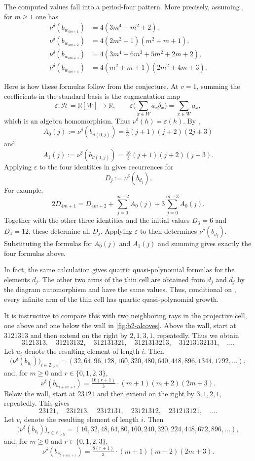 \documentclass[a4paper,11pt]{amsart}
\renewcommand{\dots}{\text{...}}
\newcommand{\R}{\mathbb{R}}
\newcommand{\Z}{\mathbb{Z}}
\newcommand{\Hecke}{\mc H}
\newcommand{\mc}{\mathcal}
\numberwithin{equation}{subsection}
\theoremstyle{definition}
\theoremstyle{remark}
\begin{document}
The computed values fall into a period-four pattern. More precisely,
assuming \cite[Conjecture~6.1]{BaBiPl-KL-B2}, for \(m\geq1\) one has
\[
\begin{aligned}
\nu^\delta(b_{w_{4m+1}})
&=
4(3m^4+m^2+2),
\\
\nu^\delta(b_{w_{4m+2}})
&=
4(2m^2+1)(m^2+m+1),\\
\nu^\delta(b_{w_{4m+3}})
&=
4(3m^4+6m^3+5m^2+2m+2),\\
\nu^\delta(b_{w_{4m+4}})
&=
4(m^2+m+1)(2m^2+4m+3).
\end{aligned}
\]

Here is how these formulas follow from the conjecture. At \(v=1\), summing
the coefficients in the standard basis is the augmentation map
\[
\varepsilon\colon\Hecke=\R[W]\longrightarrow\R,
\qquad
\varepsilon\big(\sum_{x\in W}a_x\delta_x\big)=\sum_{x\in W}a_x,
\]
which is an algebra homomorphism. Thus
\(\nu^\delta(h)=\varepsilon(h)\). By
\cite[Theorem~1.1 and Corollary~2.5]{BaBiPl-KL-B2},
\[
A_0(j):=\nu^\delta(b_{\vartheta(0,j)})
=
\tfrac{4}{3}(j+1)(j+2)(2j+3)
\]
and
\[
A_1(j):=\nu^\delta(b_{\vartheta(1,j)})
=
\tfrac{16}{3}(j+1)(j+2)(j+3).
\]
Applying \(\varepsilon\) to the four identities in
\cite[Conjecture~6.1(2)]{BaBiPl-KL-B2} gives recurrences for
\[
D_j:=\nu^\delta(b_{d_j}).
\]
For example,
\[
2D_{4m+1}
=
D_{4m+2}
+
\sum_{j=0}^{m-2}A_0(j)
+
3\sum_{j=0}^{m-3}A_0(j).
\]
Together with the other three identities and the initial values
\(D_3=6\) and \(D_4=12\), these determine all \(D_j\).
Applying \(\varepsilon\) to
\cite[Conjecture~6.1(3)]{BaBiPl-KL-B2} then determines
\(\nu^\delta(b_{\overline d_j})\). Substituting the formulas for
\(A_0(j)\) and \(A_1(j)\) and summing gives exactly the four formulas above.

In fact, the same calculation gives quartic quasi-polynomial formulas for
the elements \(d_j\). The other two arms of the thin cell are obtained from
\(d_j\) and \(\overline d_j\) by the diagram automorphism and have the same
values. Thus, conditional on \cite[Conjecture~6.1]{BaBiPl-KL-B2}, every
infinite arm of the thin cell has quartic quasi-polynomial growth.

It is instructive to compare this with two neighboring rays in the projective cell, one above and one below the wall in \autoref{fig:b2-alcoves}. Above the wall,
start at
$3121313$
and then extend on the right by \(2,1,3,1\), repeatedly. Thus we obtain
\[
3121313,\quad
31213132,\quad
312131321,\quad
3121313213,\quad
31213132131,\quad\dots.
\]
Let \(u_i\) denote the resulting element of length \(i\). Then
\[
\big(\nu^\delta(b_{u_i})\big)_{i\in\Z_{\geq 7}}
=
(32,64,96,128,160,320,480,640,448,896,1344,1792,\dots),
\]
and, for \(m\geq 0\) and \(r\in\{0,1,2,3\}\),
\[
\nu^\delta(b_{u_{7+4m+r}})
=
\tfrac{16(r+1)}{3}\cdot(m+1)(m+2)(2m+3).
\]
Below the wall, start at $23121$
and then extend on the right by \(3,1,2,1\), repeatedly. This gives
\[
23121,\quad
231213,\quad
2312131,\quad
23121312,\quad
231213121,\quad\dots.
\]
Let \(v_i\) denote the resulting element of length \(i\). Then
\[
\big(\nu^\delta(b_{v_i})\big)_{i\in\Z_{\geq 5}}
=
(16,32,48,64,80,160,240,320,224,448,672,896,\dots),
\]
and, for \(m\geq 0\) and \(r\in\{0,1,2,3\}\),
\[
\nu^\delta(b_{v_{5+4m+r}})
=
\tfrac{8(r+1)}{3}\cdot(m+1)(m+2)(2m+3).
\]
\end{document}
